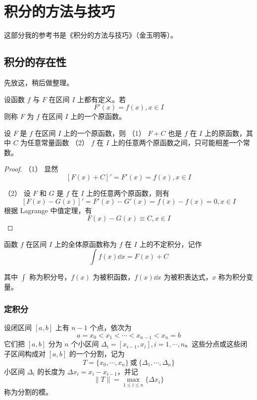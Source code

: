 \chapter{积分的方法与技巧}

这部分我的参考书是《积分的方法与技巧》（金玉明等）。

\section{积分的存在性}

先放这，稍后做整理。

\begin{definition}
    设函数 $f$ 与 $F$ 在区间 $I$ 上都有定义。若
    $$F'(x) = f(x), x\in I$$
    则称 $F$ 为 $f$ 在区间 $I$ 上的一个原函数。
\end{definition}

\begin{theorem}
    设 $F$ 是 $f$ 在区间 $I$ 上的一个原函数，则
    （1） $F+C$ 也是 $f$ 在 $I$ 上的原函数，其中 $C$ 为任意常量函数
    （2） $f$ 在 $I$ 上的任意两个原函数之间，只可能相差一个常数。
\end{theorem}
\begin{proof}
    （1） 显然
    $$\left[ F(x)+C \right]' = F'(x) = f(x), x\in I$$
    
    （2） 设 $F$ 和 $G$ 是 $f$ 在 $I$ 上的任意两个原函数，则有
    $$\left[ F(x)-G(x) \right]' = F'(x) - G'(x) = f(x) - f(x) = 0, x\in I$$
    根据 Lagrange 中值定理，有
    $$F(x) - G(x) \equiv C, x\in I$$
\end{proof}

\begin{definition}
    函数 $f$ 在区间 $I$ 上的全体原函数称为 $f$ 在 $I$ 上的不定积分，记作
    $$\int f(x) \dd x = F(x) + C$$
\end{definition}

其中 $\displaystyle\int$ 称为积分号，$f(x)$ 为被积函数，$f(x)\dd x$ 为被积表达式，$x$ 称为积分变量。

\subsection{定积分}

设闭区间 $[a,b]$ 上有 $n-1$ 个点，依次为
$$a = x_0 < x_1 < \cdots < x_{n-1} < x_n = b$$
它们把 $[a,b]$ 分为 $n$ 个小区间 $\Delta_i = [x_{i-1},x_i], i=1,\cdots,n$。这些分点或这些闭子区间构成对 $[a,b]$ 的一个分割，记为
$$T=\{x_0,\cdots,x_n\}\ \text{或}\ \{\Delta_1,\cdots,\Delta_n\}$$
小区间 $\Delta_i$ 的长度为 $\Delta x_i = x_i-x_{i-1}$，并记 
$$\| T \| = \max_{1 \leqslant i \leqslant n}\{\Delta x_i\}$$
称为分割的模。

